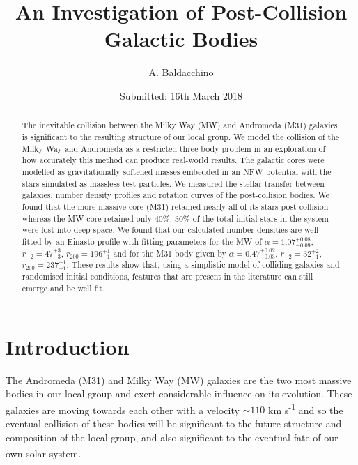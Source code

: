 \documentclass[10pt, twocolumn]{revtex4}    %
\begin{document}
                     

\title{An Investigation of Post-Collision Galactic Bodies} 
\date{Submitted: 16th March 2018}
\author{A. Baldacchino}

\begin{abstract}              
 
The inevitable collision between the Milky Way (MW) and Andromeda (M31) galaxies is significant to the resulting structure of our local group. We model the collision of the Milky Way and Andromeda as a restricted three body problem in an exploration of how accurately this method can produce real-world results. The galactic cores were modelled as gravitationally softened masses embedded in an NFW potential with the stars simulated as massless test particles. We measured the stellar transfer between galaxies, number density profiles and rotation curves of the post-collision bodies. We found that the more massive core (M31) retained nearly all of its stars  post-collision whereas the MW core retained only $40\%$. $30\%$ of the total initial stars in the system were lost into deep space. We found that our calculated number densities are well fitted by an Einasto profile with fitting parameters for the MW of $\alpha=1.07^{+0.08}_{-0.09}$, $r_{-2}=47^{+3}_{-3}$,  $r_{200}=196^{+1}_{-1}$ and for the M31 body given by $\alpha=0.47^{+0.02}_{-0.03}$, $r_{-2}=32^{+2}_{-1}$,  $r_{200}=237^{+1}_{-1}$. These results show that, using a simplistic model of colliding galaxies and randomised initial conditions, features that are present in the literature can still emerge and be well fit.
\end{abstract}

\maketitle
\thispagestyle{plain} %

\section{Introduction} 

The Andromeda (M31) and Milky Way (MW) galaxies are the two most massive bodies in our local group and exert considerable influence on its evolution. These galaxies are moving towards each other with a velocity ${\sim}110$ km s\textsuperscript{-1} and so the eventual collision of these bodies will be significant to the future structure and composition of the local group, and also significant to the eventual fate of our own solar system.\textsuperscript{\cite{vanderMarelM31VelocityVector2012}}
\end{document}
